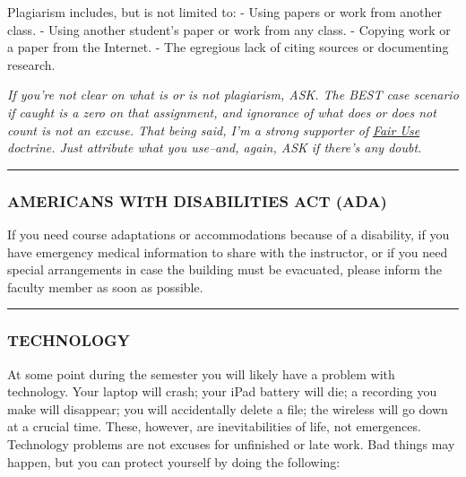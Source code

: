 \documentclass[]{tufte-handout}
\begin{document}
Plagiarism includes, but is not limited to: - Using papers or work from
another class. - Using another student's paper or work from any class. -
Copying work or a paper from the Internet. - The egregious lack of
citing sources or documenting research.

\emph{If you're not clear on what is or is not plagiarism, ASK. The BEST
case scenario if caught is a zero on that assignment, and ignorance of
what does or does not count is not an excuse. That being said, I'm a
strong supporter of}
\emph{\href{https://en.wikipedia.org/wiki/Fair_Use}{Fair Use} doctrine.
Just attribute what you use--and, again, ASK if there's any doubt.}

\begin{center}\rule{0.5\linewidth}{0.5pt}\end{center}

\hypertarget{americans-with-disabilities-act-ada}{%
\subsubsection{AMERICANS WITH DISABILITIES ACT
(ADA)}\label{americans-with-disabilities-act-ada}}

If you need course adaptations or accommodations because of a
disability, if you have emergency medical information to share with the
instructor, or if you need special arrangements in case the building
must be evacuated, please inform the faculty member as soon as possible.

\begin{center}\rule{0.5\linewidth}{0.5pt}\end{center}

\hypertarget{technology}{%
\subsubsection{TECHNOLOGY}\label{technology}}

At some point during the semester you will likely have a problem with
technology. Your laptop will crash; your iPad battery will die; a
recording you make will disappear; you will accidentally delete a file;
the wireless will go down at a crucial time. These, however, are
inevitabilities of life, not emergences. Technology problems are not
excuses for unfinished or late work. Bad things may happen, but you can
protect yourself by doing the following:
\end{document}

